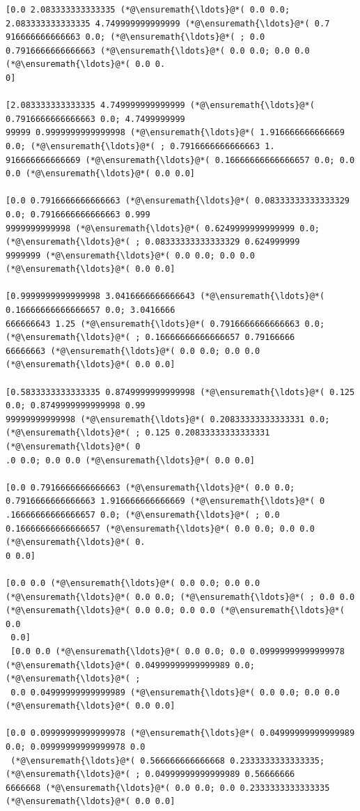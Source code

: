 \documentclass[12pt,a4paper]{article}
\begin{document}
\begin{lstlisting}
[0.0 2.083333333333335 (*@\ensuremath{\ldots}@*( 0.0 0.0; 2.083333333333335 4.749999999999999 (*@\ensuremath{\ldots}@*( 0.7
916666666666663 0.0; (*@\ensuremath{\ldots}@*( ; 0.0 0.7916666666666663 (*@\ensuremath{\ldots}@*( 0.0 0.0; 0.0 0.0 (*@\ensuremath{\ldots}@*( 0.0 0.
0]

[2.083333333333335 4.749999999999999 (*@\ensuremath{\ldots}@*( 0.7916666666666663 0.0; 4.7499999999
99999 0.9999999999999998 (*@\ensuremath{\ldots}@*( 1.916666666666669 0.0; (*@\ensuremath{\ldots}@*( ; 0.7916666666666663 1.
916666666666669 (*@\ensuremath{\ldots}@*( 0.16666666666666657 0.0; 0.0 0.0 (*@\ensuremath{\ldots}@*( 0.0 0.0]

[0.0 0.7916666666666663 (*@\ensuremath{\ldots}@*( 0.08333333333333329 0.0; 0.7916666666666663 0.999
9999999999998 (*@\ensuremath{\ldots}@*( 0.6249999999999999 0.0; (*@\ensuremath{\ldots}@*( ; 0.08333333333333329 0.624999999
9999999 (*@\ensuremath{\ldots}@*( 0.0 0.0; 0.0 0.0 (*@\ensuremath{\ldots}@*( 0.0 0.0]

[0.9999999999999998 3.0416666666666643 (*@\ensuremath{\ldots}@*( 0.16666666666666657 0.0; 3.0416666
666666643 1.25 (*@\ensuremath{\ldots}@*( 0.7916666666666663 0.0; (*@\ensuremath{\ldots}@*( ; 0.16666666666666657 0.79166666
66666663 (*@\ensuremath{\ldots}@*( 0.0 0.0; 0.0 0.0 (*@\ensuremath{\ldots}@*( 0.0 0.0]

[0.5833333333333335 0.8749999999999998 (*@\ensuremath{\ldots}@*( 0.125 0.0; 0.8749999999999998 0.99
99999999999998 (*@\ensuremath{\ldots}@*( 0.20833333333333331 0.0; (*@\ensuremath{\ldots}@*( ; 0.125 0.20833333333333331 (*@\ensuremath{\ldots}@*( 0
.0 0.0; 0.0 0.0 (*@\ensuremath{\ldots}@*( 0.0 0.0]

[0.0 0.7916666666666663 (*@\ensuremath{\ldots}@*( 0.0 0.0; 0.7916666666666663 1.916666666666669 (*@\ensuremath{\ldots}@*( 0
.16666666666666657 0.0; (*@\ensuremath{\ldots}@*( ; 0.0 0.16666666666666657 (*@\ensuremath{\ldots}@*( 0.0 0.0; 0.0 0.0 (*@\ensuremath{\ldots}@*( 0.
0 0.0]

[0.0 0.0 (*@\ensuremath{\ldots}@*( 0.0 0.0; 0.0 0.0 (*@\ensuremath{\ldots}@*( 0.0 0.0; (*@\ensuremath{\ldots}@*( ; 0.0 0.0 (*@\ensuremath{\ldots}@*( 0.0 0.0; 0.0 0.0 (*@\ensuremath{\ldots}@*( 0.0
 0.0]
 [0.0 0.0 (*@\ensuremath{\ldots}@*( 0.0 0.0; 0.0 0.09999999999999978 (*@\ensuremath{\ldots}@*( 0.04999999999999989 0.0; (*@\ensuremath{\ldots}@*( ;
 0.0 0.04999999999999989 (*@\ensuremath{\ldots}@*( 0.0 0.0; 0.0 0.0 (*@\ensuremath{\ldots}@*( 0.0 0.0]

[0.0 0.09999999999999978 (*@\ensuremath{\ldots}@*( 0.04999999999999989 0.0; 0.09999999999999978 0.0
 (*@\ensuremath{\ldots}@*( 0.566666666666668 0.2333333333333335; (*@\ensuremath{\ldots}@*( ; 0.04999999999999989 0.56666666
6666668 (*@\ensuremath{\ldots}@*( 0.0 0.0; 0.0 0.2333333333333335 (*@\ensuremath{\ldots}@*( 0.0 0.0]


\end{lstlisting}
\end{document}
